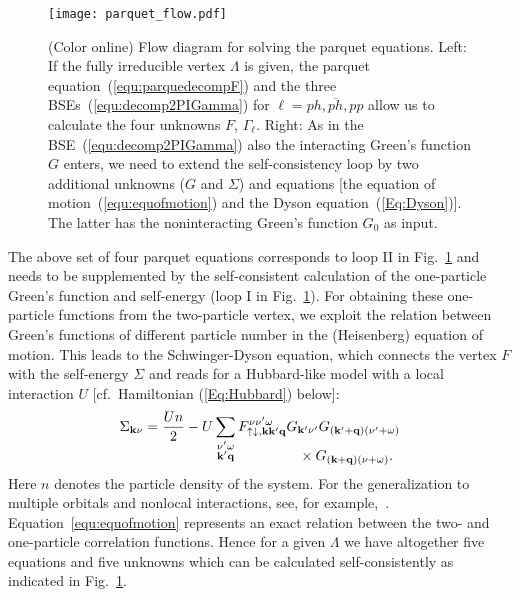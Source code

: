 \documentclass[rmp,aps,reprint,amsmath,amssymb,superscriptaddress,showpacs,nofootinbib]{revtex4-1}
\begin{document}
\begin{figure}[tb]
  \centering
  \texttt{[image: parquet\_flow.pdf]}
    \caption{(Color online) Flow diagram for solving the parquet equations. Left: If the fully irreducible vertex $\Lambda$ is given, the parquet equation~(\ref{equ:parquedecompF}) and the three BSEs~(\ref{equ:decomp2PIGamma}) for $\ell=ph,\overline{ph},pp$ allow us to calculate the four unknowns $F$, $\Gamma_\ell$. Right: As in the BSE~(\ref{equ:decomp2PIGamma}) also the interacting Green's function $G$ enters, we need to extend the self-consistency loop by two additional unknowns ($G$ and $\Sigma$) and equations [the equation of motion~(\ref{equ:equofmotion})  and the Dyson equation~(\ref{Eq:Dyson})]. The latter has the noninteracting Green's function $G_0$ as input.}
  \label{fig:parquet}
\end{figure}

The above set of four parquet equations corresponds to loop {\sc II} in  Fig.~\ref{fig:parquet} and needs to be supplemented by the self-consistent calculation of the one-particle Green's function and self-energy (loop {\sc I} in Fig.~\ref{fig:parquet}).  For obtaining these one-particle functions from the two-particle  vertex, we exploit the relation between Green's functions of different particle number in  the (Heisenberg) equation of motion. This leads to the Schwinger-Dyson equation, which connects the vertex $F$ with the self-energy $\Sigma$ and reads for a Hubbard-like model with a local interaction $U$ [cf.\  Hamiltonian (\ref{Eq:Hubbard}) below]:
\begin{align}
\label{equ:equofmotion}
 \Sigma_{\mathbf{k}\nu}=\frac{Un}{2}-{U}\sum_{\substack{\nu'\omega\\\mathbf{k'}\mathbf{q}}}F_{\uparrow\downarrow,\mathbf{kk'q}}^{\nu\nu'\omega}&G_{\mathbf{k'}\nu'}G_{(\mathbf{k'}+\mathbf{q})(\nu'+\omega)}\nonumber\\[-0.5cm]&\hspace{0.3cm}\times G_{(\mathbf{k}+\mathbf{q})(\nu+\omega)}. 
\end{align}
Here $n$ denotes the particle density of the system. For the generalization to multiple orbitals and nonlocal interactions, see, for example,~. Equation~\eqref{equ:equofmotion} represents an exact relation between the two- and one-particle correlation functions.  Hence for a given $\Lambda$ we have altogether five equations and five unknowns which can be calculated self-consistently as indicated in Fig.~\ref{fig:parquet}.
\end{document}
